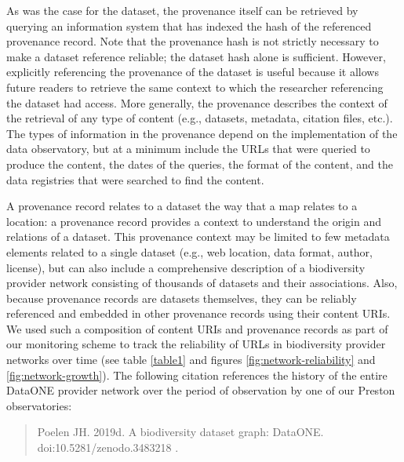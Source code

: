 As was the case for the dataset, the provenance itself can be retrieved by querying an information system that has indexed the hash of the referenced provenance record. Note that the provenance hash is not strictly necessary to make a dataset reference reliable; the dataset hash alone is sufficient. However, explicitly referencing the provenance of the dataset is useful because it allows future readers to retrieve the same context to which the researcher referencing the dataset had access. More generally, the provenance describes the context of the retrieval of any type of content (e.g., datasets, metadata, citation files, etc.). The types of information in the provenance depend on the implementation of the data observatory, but at a minimum include the URLs that were queried to produce the content, the dates of the queries, the format of the content, and the data registries that were searched to find the content.

A provenance record relates to a dataset the way that a map relates to a location: a provenance record provides a context to understand the origin and relations of a dataset. This provenance context may be limited to few metadata elements related to a single dataset (e.g., web location, data format, author, license), but can also include a comprehensive description of a biodiversity provider network consisting of thousands of datasets and their associations. Also, because provenance records are datasets themselves, they can be reliably referenced and embedded in other provenance records using their content URIs. We used such a composition of content URIs and provenance records as part of our monitoring scheme \citep{jorrit_poelen_2018_1410543} to track the reliability of URLs in biodiversity provider networks over time (see table \ref{table1} and figures \ref{fig:network-reliability} and \ref{fig:network-growth}). The following citation references the history of the entire DataONE provider network over the period of observation by one of our Preston observatories:

\begin{quote}
Poelen JH. 2019d. A biodiversity dataset graph: DataONE.
doi:10.5281/zenodo.3483218 . 
\end{quote}


